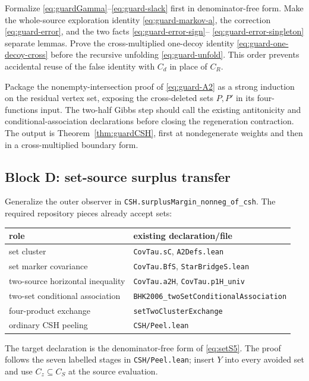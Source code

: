 \documentclass[11pt]{article}
\theoremstyle{definition}
\theoremstyle{remark}
\newcommand{\lean}[1]{\texttt{#1}}
\begin{document}
Formalize \eqref{eq:guardGamma}--\eqref{eq:guard-slack} first in
denominator-free form.  Make the whole-source exploration identity
\eqref{eq:guard-markov-a}, the correction \eqref{eq:guard-error}, and
the two facts \eqref{eq:guard-error-sign}--
\eqref{eq:guard-error-singleton} separate lemmas.  Prove the
cross-multiplied one-decoy identity \eqref{eq:guard-one-decoy-cross}
before the recursive unfolding \eqref{eq:guard-unfold}.  This order
prevents accidental reuse of the false identity with $C_d$ in place of
$C_R$.

Package the nonempty-intersection proof of \eqref{eq:guard-A2} as a
strong induction on the residual vertex set, exposing the cross-deleted
sets $P,P'$ in its four-functions input.  The two-half Gibbs step should
call the existing antitonicity and conditional-association declarations
before closing the regeneration contraction.  The output is
Theorem~\ref{thm:guardCSH}, first at nondegenerate weights and then in a
cross-multiplied boundary form.

\subsection*{Block D: set-source surplus transfer}

Generalize the outer observer in
\lean{CSH.surplusMargin\_nonneg\_of\_csh}.  The required repository pieces
already accept sets:
\begin{center}
\begin{tabular}{@{}ll@{}}
\toprule
role & existing declaration/file\\
\midrule
set cluster & \lean{CovTau.sC}, \lean{A2Defs.lean}\\
set marker covariance & \lean{CovTau.BfS}, \lean{StarBridgeS.lean}\\
two-source horizontal inequality & \lean{CovTau.a2H},
  \lean{CovTau.p1H\_univ}\\
two-set conditional association &
  \lean{BHK2006\_twoSetConditionalAssociation}\\
four-product exchange & \lean{setTwoClusterExchange}\\
ordinary CSH peeling & \lean{CSH/Peel.lean}\\
\bottomrule
\end{tabular}
\end{center}
The target declaration is the denominator-free form of
\eqref{eq:setS5}.  The proof follows the seven labelled stages in
\lean{CSH/Peel.lean}; insert $Y$ into every avoided set and use
$C_z\subseteq C_S$ at the source evaluation.
\end{document}
